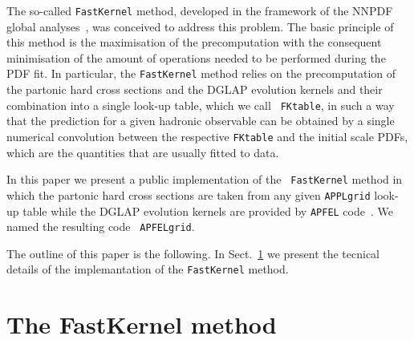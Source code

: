 \documentclass[preprint,12pt]{elsarticle}
\begin{document}
The so-called {\tt FastKernel} method, developed in the framework of
the NNPDF global analyses~\cite{Ball:2010de}, was conceived to address
this problem. The basic principle of this method is the maximisation
of the precomputation with the consequent minimisation of the amount
of operations needed to be performed during the PDF fit. In
particular, the {\tt FastKernel} method relies on the precomputation
of the partonic hard cross sections and the DGLAP evolution kernels
and their combination into a single look-up table, which we call {\tt
  FKtable}, in such a way that the prediction for a given hadronic
observable can be obtained by a single numerical convolution between
the respective {\tt FKtable} and the initial scale PDFs, which are
the quantities that are usually fitted to data.

In this paper we present a public implementation of the {\tt
  FastKernel} method in which the partonic hard cross sections are
taken from any given {\tt APPLgrid} look-up table while the DGLAP
evolution kernels are provided by {\tt APFEL}
code~\cite{Bertone:2013vaa}. We named the resulting code {\tt
  APFELgrid}.

The outline of this paper is the following. In
Sect.~\ref{sec:FastKernel} we present the tecnical details of the
implemantation of the {\tt FastKernel} method.

\section{The FastKernel method}\label{sec:FastKernel}
\end{document}
